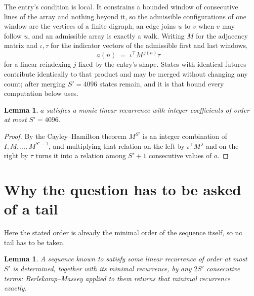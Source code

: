 \documentclass[11pt,a4paper]{article}
\theoremstyle{plain}
\newtheorem{lemma}[theorem]{Lemma}
\theoremstyle{definition}
\begin{document}
The entry's condition is local. It constrains a bounded window of consecutive lines of the
array and nothing beyond it, so the admissible configurations of one window are the vertices of
a finite digraph, an edge joins $u$ to $v$ when $v$ may follow $u$, and an admissible array is
exactly a walk. Writing $M$ for the adjacency matrix and $\iota,\tau$ for the indicator vectors
of the admissible first and last windows,
\[
a(n)\;=\;\iota^{\!\top}M^{\,j(n)}\tau
\]
for a linear reindexing $j$ fixed by the entry's shape. States with identical futures
contribute identically to that product and may be merged without changing any count; after
merging $S'=4096$ states remain, and it is that bound every computation below uses.

\begin{lemma}\label{lem:cf}
$a$ satisfies a monic linear recurrence with integer coefficients of order at most $S'=4096$.
\end{lemma}

\begin{proof}
By the Cayley--Hamilton theorem $M^{S'}$ is an integer combination of $I,M,\dots,M^{S'-1}$,
and multiplying that relation on the left by $\iota^{\!\top}M^{\,j}$ and on the right by
$\tau$ turns it into a relation among $S'+1$ consecutive values of $a$.
\end{proof}

\section{Why the question has to be asked of a tail}

Here the stated order is already the minimal order of the sequence itself, so no tail has to be taken.

\begin{lemma}\label{lem:bm}
A sequence known to satisfy some linear recurrence of order at most $S'$ is determined,
together with its minimal recurrence, by any $2S'$ consecutive terms: Berlekamp--Massey applied
to them returns that minimal recurrence exactly.
\end{lemma}
\end{document}
